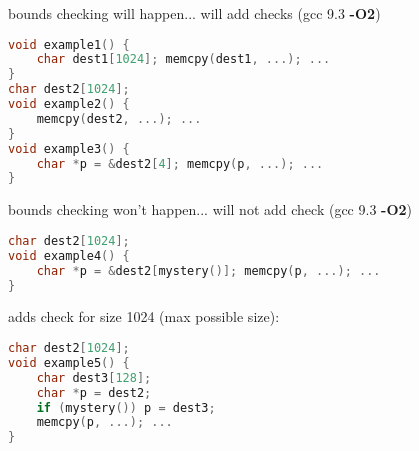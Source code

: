 \begin{frame}[fragile,label=fortifySrcExample]{bounds checking will happen...}
will add checks (gcc 9.3 \textbf{-O2})
\begin{lstlisting}[language=C,style=smaller]
void example1() {
    char dest1[1024]; memcpy(dest1, ...); ...
}
char dest2[1024];
void example2() {
    memcpy(dest2, ...); ...
}
void example3() {
    char *p = &dest2[4]; memcpy(p, ...); ...
}
\end{lstlisting}
\end{frame}

\begin{frame}[fragile,label=fortifySrcExmaple2]{bounds checking won't happen...}
will not add check (gcc 9.3 \textbf{-O2})
\begin{lstlisting}[language=C,style=smaller]
char dest2[1024];
void example4() {
    char *p = &dest2[mystery()]; memcpy(p, ...); ...
}
\end{lstlisting}
adds check for size 1024 (max possible size):
\begin{lstlisting}[language=C,style=smaller]
char dest2[1024];
void example5() {
    char dest3[128];
    char *p = dest2;
    if (mystery()) p = dest3;
    memcpy(p, ...); ...
}
\end{lstlisting}
\end{frame}
